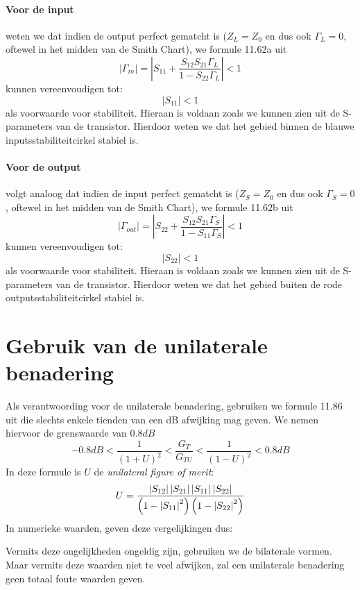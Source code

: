     \paragraph{Voor de input} weten we dat indien de output perfect gematcht is
    ($Z_L = Z_0$ en dus ook $\Gamma_L = 0$, oftewel in het midden van de Smith
    Chart), we formule 11.62a uit \cite{Pozar}
    \[
      \left| \Gamma_{in} \right| = \left| S_{11} + \frac{S_{12}S_{21}\Gamma_L}{1 - S_{22}\Gamma_L} \right| < 1
    \]
    kunnen vereenvoudigen tot:
    \[
      \left| S_{11} \right|  < 1
    \]
    als voorwaarde voor stabiliteit. Hieraan is voldaan zoals we kunnen zien uit
    de S-parameters van de transistor. Hierdoor weten we dat het gebied binnen
    de blauwe inputsstabiliteitcirkel stabiel is.
    
    \paragraph{Voor de output} volgt analoog dat indien de input perfect
    gematcht is ($Z_S = Z_0$ en dus ook $\Gamma_S = 0$, oftewel in het
    midden van de Smith Chart), we formule 11.62b uit \cite{Pozar}
    \[
      \left| \Gamma_{out} \right| = \left| S_{22} + \frac{S_{12}S_{21}\Gamma_S}{1 - S_{11}\Gamma_S} \right| < 1
    \]
    kunnen vereenvoudigen tot:
    \[
      \left| S_{22} \right|  < 1
    \]
    als voorwaarde voor stabiliteit. Hieraan is voldaan zoals we kunnen zien uit
    de S-parameters van de transistor. Hierdoor weten we dat het gebied buiten
    de rode outputsstabiliteitcirkel stabiel is.
    

\section{Gebruik van de unilaterale benadering}
  Als verantwoording voor de unilaterale benadering, gebruiken we formule 11.86
  uit \cite{Pozar} die slechts enkele tienden van een dB afwijking mag geven.
  We nemen hiervoor de grenswaarde van $0.8 dB$
  \[
    -0.8 dB < \frac{1}{\left( 1 + U\right)^ 2} < \frac{G_T}{G_{TU}} < \frac{1}{\left( 1 - U\right)^ 2} < 0.8 dB
  \]
  In deze formule is $U$ de \textit{unilateral figure of merit}:
  \[
    U = \frac{\left| S_{12} \right| \left| S_{21} \right| \left| S_{11} \right| \left| S_{22} \right|}{ \left( 1 - \left| S_{11} \right|^2 \right) \left( 1 - \left| S_{22} \right|^2 \right)}
  \]
  In numerieke waarden, geven deze vergelijkingen dus:
    
  Vermits deze ongelijkheden ongeldig zijn, gebruiken we de bilaterale vormen.
  Maar vermits deze waarden niet te veel afwijken, zal een unilaterale
  benadering geen totaal foute waarden geven.
  
